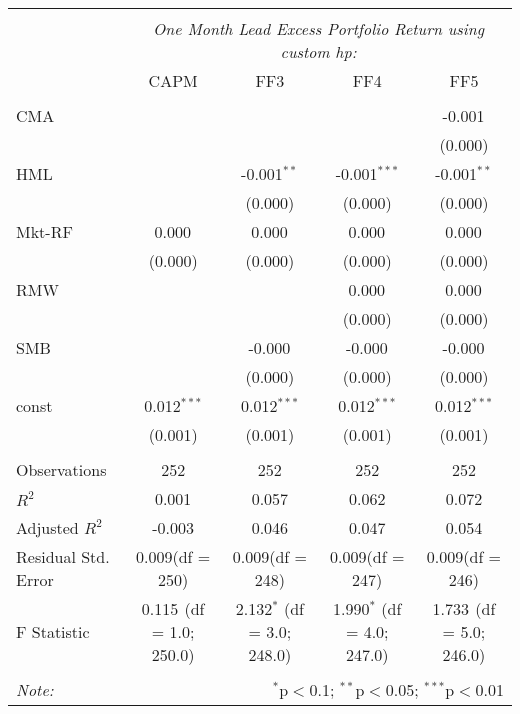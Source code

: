 \begin{table}[!htbp] \centering
\begin{tabular}{@{\extracolsep{5pt}}lcccc}
\\[-1.8ex]\hline
\hline \\[-1.8ex]
& \multicolumn{4}{c}{\textit{One Month Lead Excess Portfolio Return using custom hp:}} \
\cr \cline{4-5}
\\[-1.8ex] & CAPM & FF3 & FF4 & FF5 \\
\hline \\[-1.8ex]
 CMA & & & & -0.001$^{}$ \\
  & & & & (0.000) \\
 HML & & -0.001$^{**}$ & -0.001$^{***}$ & -0.001$^{**}$ \\
  & & (0.000) & (0.000) & (0.000) \\
 Mkt-RF & 0.000$^{}$ & 0.000$^{}$ & 0.000$^{}$ & 0.000$^{}$ \\
  & (0.000) & (0.000) & (0.000) & (0.000) \\
 RMW & & & 0.000$^{}$ & 0.000$^{}$ \\
  & & & (0.000) & (0.000) \\
 SMB & & -0.000$^{}$ & -0.000$^{}$ & -0.000$^{}$ \\
  & & (0.000) & (0.000) & (0.000) \\
 const & 0.012$^{***}$ & 0.012$^{***}$ & 0.012$^{***}$ & 0.012$^{***}$ \\
  & (0.001) & (0.001) & (0.001) & (0.001) \\
\hline \\[-1.8ex]
 Observations & 252 & 252 & 252 & 252 \\
 $R^2$ & 0.001 & 0.057 & 0.062 & 0.072 \\
 Adjusted $R^2$ & -0.003 & 0.046 & 0.047 & 0.054 \\
 Residual Std. Error & 0.009(df = 250) & 0.009(df = 248) & 0.009(df = 247) & 0.009(df = 246)  \\
 F Statistic & 0.115$^{}$ (df = 1.0; 250.0) & 2.132$^{*}$ (df = 3.0; 248.0) & 1.990$^{*}$ (df = 4.0; 247.0) & 1.733$^{}$ (df = 5.0; 246.0) \\
\hline
\hline \\[-1.8ex]
\textit{Note:} & \multicolumn{4}{r}{$^{*}$p$<$0.1; $^{**}$p$<$0.05; $^{***}$p$<$0.01} \\
\end{tabular}
\end{table}
